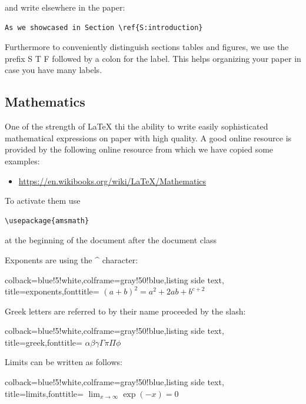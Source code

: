 and write elsewhere in the paper:

\begin{verbatim}
As we showcased in Section \ref{S:introduction}
\end{verbatim}

Furthermore to conveniently distinguish sections tables and figures, we
use the prefix S T F followed by a colon for the label. This helps
organizing your paper in case you have many labels.

\subsection{Mathematics}\label{math}

One of the strength of LaTeX thi the ability to write easily
sophisticated mathematical expressions on paper with high quality. A
good online resource is provided by the following online resource from
which we have copied some examples:

\begin{itemize}

\item
  \url{https://en.wikibooks.org/wiki/LaTeX/Mathematics}
\end{itemize}

To activate them use 

\begin{verbatim}
\usepackage{amsmath}
\end{verbatim}

at the beginning of the document after the document class

Exponents are using the \^{} character:

\begin{tcblisting}{colback=blue!5!white,colframe=gray!50!blue,listing side text,
  title=exponents,fonttitle=\bfseries}
$(a+b)^2 = a^2 + 2ab + b^{c+2}$
\end{tcblisting} 

Greek letters are referred to by their name proceeded by the slash:

\begin{tcblisting}{colback=blue!5!white,colframe=gray!50!blue,listing side text,
  title=greek,fonttitle=\bfseries}
$ \alpha \beta \gamma \Gamma \pi \Pi \phi $
\end{tcblisting}


Limits can be written as follows:

\begin{tcblisting}{colback=blue!5!white,colframe=gray!50!blue,listing side text,  title=limits,fonttitle=\bfseries}
$ \lim_{x \to \infty} \exp(-x) = 0 $
\end{tcblisting}

